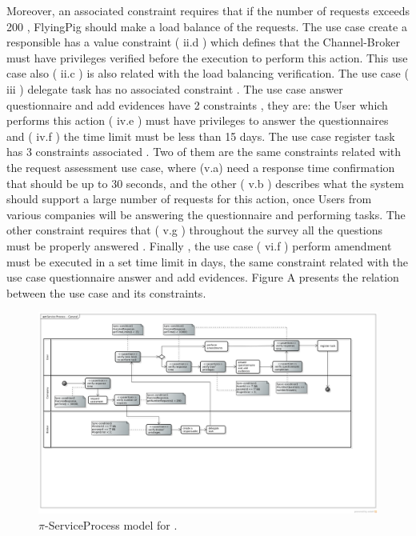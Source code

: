 Moreover, an associated constraint requires that if the number of requests exceeds 200 , FlyingPig should make a load balance of the requests. The use case create a responsible has a value constraint ( ii.d ) which defines that the Channel-Broker must have privileges verified before the execution to perform this action. This use case also ( ii.c ) is also related with the load balancing verification. The use case ( iii ) delegate task has no associated constraint . The use case answer questionnaire and add evidences have 2 constraints , they are: the User which performs this action ( iv.e ) must have privileges to answer the questionnaires and ( iv.f ) the time limit must be less than 15 days. The use case register task has 3 constraints associated . Two of them are the same constraints related with the request assessment use case, where (v.a) need a response time confirmation that should be up to 30 seconds, and the other ( v.b ) describes what the system should support a large number of requests for this action, once Users from various companies will be answering the questionnaire and performing tasks. The other constraint requires that ( v.g ) throughout the survey all the questions must be properly answered . Finally , the use case ( vi.f ) perform amendment must be executed in a set time limit in days, the same constraint related with the use case questionnaire answer and add evidences. Figure A presents the relation between the use case and its constraints.








\begin{figure}
\centering
\includegraphics[width=1.0\textwidth]{figs/ServiceProcessGeneral.png}
\caption{$\pi$-ServiceProcess model for \FlyingPig.\label{fig:PiServiceProcessModel}}
\end{figure}

